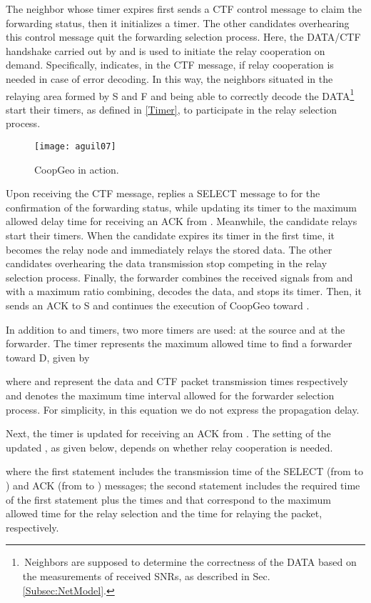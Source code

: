 \documentclass[journal,twoside,final]{IEEEtran}
\begin{document}
The neighbor  whose timer expires first sends a CTF control message to claim the forwarding status, then it initializes a  timer. The other candidates overhearing this control message quit the forwarding selection process.
Here, the DATA/CTF handshake carried out by  and  is used to initiate the relay cooperation on demand. Specifically,  indicates, in the CTF message, if relay cooperation is needed in case of error decoding. In this way, the neighbors situated in the relaying area formed by S and F and being able to correctly decode the DATA\footnote{\,Neighbors are supposed to determine the correctness of the DATA based on the measurements of received SNRs, as described in Sec. \ref{Subsec:NetModel}.}  start their  timers, as defined in \eqref{Timer}, to participate in the relay selection process.

\begin{figure}[t]
  \centering
  \texttt{[image: aguil07]}      \caption{CoopGeo in action.}\label{fig:inAction}
\end{figure}

Upon receiving the CTF message,  replies a SELECT message to  for the confirmation of the forwarding status, while updating its  timer to the maximum allowed delay time for receiving an ACK from . Meanwhile, the candidate relays start their  timers. When the candidate  expires its  timer in the first time, it becomes the relay node and immediately relays the stored data. The other candidates overhearing the data transmission stop competing in the relay selection process.
Finally, the forwarder combines the received signals from  and  with a maximum ratio combining, decodes the data, and stops its  timer. Then, it sends an ACK to S and continues the execution of CoopGeo toward .

In addition to  and  timers, two more timers are used:  at the source and  at the forwarder. The timer  represents the maximum allowed time to find a forwarder toward D, given by

where  and  represent the data and CTF packet transmission times respectively and  denotes the maximum time interval allowed for the forwarder selection process. For simplicity, in this equation we do not express the propagation delay.

Next, the timer  is updated for receiving an ACK from . The setting of the updated , as given below, depends on whether relay cooperation is needed.

where the first statement includes the transmission time of the SELECT (from  to ) and ACK (from  to ) messages; the second statement includes the required time of the first statement plus the times  and  that correspond to the maximum allowed time for the relay selection and the time for relaying the packet, respectively.
\end{document}

